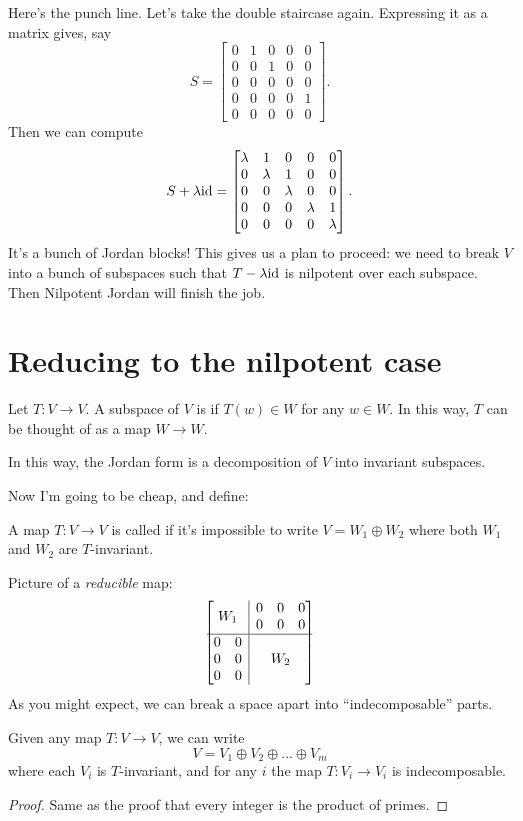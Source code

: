 Here's the punch line.
Let's take the double staircase again.
Expressing it as a matrix gives, say
\[
	S = \begin{bmatrix}
		0 & 1 & 0 & 0 & 0 \\
		0 & 0 & 1 & 0 & 0 \\
		0 & 0 & 0 & 0 & 0 \\
		0 & 0 & 0 & 0 & 1 \\
		0 & 0 & 0 & 0 & 0
	\end{bmatrix}.
\]
Then we can compute
\[
	S + \lambda \mathrm{id} = \begin{bmatrix}
		\lambda & 1 & 0 & 0 & 0 \\
		0 & \lambda & 1 & 0 & 0 \\
		0 & 0 & \lambda & 0 & 0 \\
		0 & 0 & 0 & \lambda & 1 \\
		0 & 0 & 0 & 0 & \lambda
	\end{bmatrix}.
\]
It's a bunch of Jordan blocks!
This gives us a plan to proceed: we need to break $V$ into
a bunch of subspaces such that $T - \lambda \mathrm{id}$ is nilpotent over each subspace.
Then Nilpotent Jordan will finish the job.

\section{Reducing to the nilpotent case}
\begin{definition}
	Let $T : V \to V$. A subspace of $V$ is 
	if $T(w) \in W$ for any $w \in W$.
	In this way, $T$ can be thought of as a map $W \to W$.
\end{definition}
In this way, the Jordan form is a decomposition of $V$ into invariant subspaces.

Now I'm going to be cheap, and define:
\begin{definition}
	A map $T : V \to V$ is called 
	if it's impossible to write $V = W_1 \oplus W_2$
	where both $W_1$ and $W_2$ are $T$-invariant.
\end{definition}
Picture of a \emph{reducible} map:
\[ 
	\begin{bmatrix}
		\multicolumn{2}{c|}{\multirow{2}{*}{$W_1$}} & 0 & 0 & 0  \\ 
		\multicolumn{2}{c|}{} & 0 & 0 & 0 \\ \hline
		0 & 0 & \multicolumn{3}{|c}{\multirow{3}{*}{$W_2$}} \\
		0 & 0 & \multicolumn{3}{|c}{} \\
		0 & 0 & \multicolumn{3}{|c}{} 
	\end{bmatrix}
\]
As you might expect, we can break a space apart into ``indecomposable'' parts.
\begin{proposition}
	Given any map $T: V \to V$, we can write
	\[ V = V_1 \oplus V_2 \oplus \dots \oplus V_m \]
	where each $V_i$ is $T$-invariant,
	and for any $i$ the map $T : V_i \to V_i$ is indecomposable.
\end{proposition}
\begin{proof}
	Same as the proof that every integer is the product of primes.
\end{proof}

